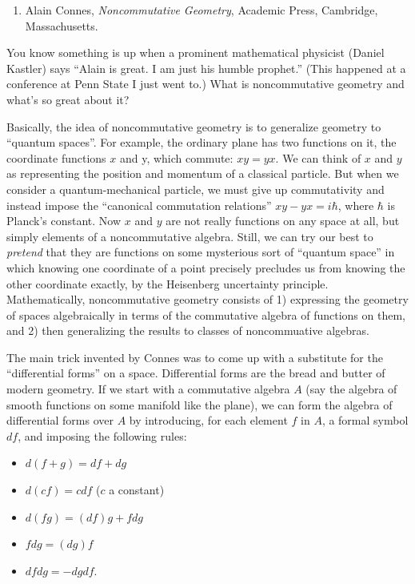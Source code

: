 \documentclass{article}
\def\tightlist{}
\begin{document}
\begin{enumerate}
\def\labelenumi{\arabic{enumi})}
\tightlist
\item
   Alain Connes, \emph{Noncommutative Geometry}, Academic Press, Cambridge,
   Massachusetts.
\end{enumerate}

You know something is up when a prominent mathematical physicist (Daniel
Kastler) says ``Alain is great. I am just his humble prophet.'' (This
happened at a conference at Penn State I just went to.) What is
noncommutative geometry and what's so great about it?

Basically, the idea of noncommutative geometry is to generalize geometry
to ``quantum spaces''. For example, the ordinary plane has two functions
on it, the coordinate functions \(x\) and y, which commute: \(xy = yx\).
We can think of \(x\) and \(y\) as representing the position and
momentum of a classical particle. But when we consider a
quantum-mechanical particle, we must give up commutativity and instead
impose the ``canonical commutation relations'' \(xy-yx = i \hbar\),
where \(\hbar\) is Planck's constant. Now \(x\) and \(y\) are not really
functions on any space at all, but simply elements of a noncommutative
algebra. Still, we can try our best to \emph{pretend} that they are
functions on some mysterious sort of ``quantum space'' in which knowing
one coordinate of a point precisely precludes us from knowing the other
coordinate exactly, by the Heisenberg uncertainty principle.
Mathematically, noncommutative geometry consists of 1) expressing the
geometry of spaces algebraically in terms of the commutative algebra of
functions on them, and 2) then generalizing the results to classes of
noncommuative algebras.

The main trick invented by Connes was to come up with a substitute for
the ``differential forms'' on a space. Differential forms are the bread
and butter of modern geometry. If we start with a commutative algebra
\(A\) (say the algebra of smooth functions on some manifold like the
plane), we can form the algebra of differential forms over \(A\) by
introducing, for each element \(f\) in \(A\), a formal symbol \(df\),
and imposing the following rules:

\begin{itemize}
\tightlist
\item
  \(d(f+g) = df + dg\)
\item
  \(d(cf) = c df\) (\(c\) a constant)
\item
  \(d(fg) = (df)g + f dg\)
\item
  \(fdg = (dg)f\)
\item
  \(df dg = -dg df\).
\end{itemize}
\end{document}

